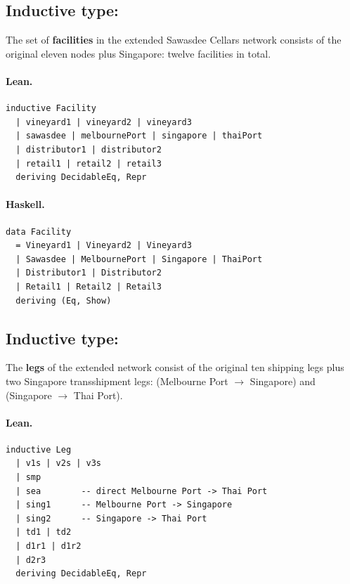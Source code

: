 \documentclass[11pt,a4paper]{article}
\begin{document}
\subsection{Inductive type: }

\begin{defn}
The set of \textbf{facilities} in the extended Sawasdee Cellars network consists
of the original eleven nodes plus Singapore: twelve facilities in total.
\end{defn}

\paragraph{Lean.}
\begin{lstlisting}[style=lean]
inductive Facility
  | vineyard1 | vineyard2 | vineyard3
  | sawasdee | melbournePort | singapore | thaiPort
  | distributor1 | distributor2
  | retail1 | retail2 | retail3
  deriving DecidableEq, Repr
\end{lstlisting}

\paragraph{Haskell.}
\begin{lstlisting}[style=haskell]
data Facility
  = Vineyard1 | Vineyard2 | Vineyard3
  | Sawasdee | MelbournePort | Singapore | ThaiPort
  | Distributor1 | Distributor2
  | Retail1 | Retail2 | Retail3
  deriving (Eq, Show)
\end{lstlisting}


\subsection{Inductive type: }

\begin{defn}
The \textbf{legs} of the extended network consist of the original ten shipping
legs plus two Singapore transshipment legs:  (Melbourne Port
$\to$ Singapore) and  (Singapore $\to$ Thai Port).
\end{defn}

\paragraph{Lean.}
\begin{lstlisting}[style=lean]
inductive Leg
  | v1s | v2s | v3s
  | smp
  | sea        -- direct Melbourne Port -> Thai Port
  | sing1      -- Melbourne Port -> Singapore
  | sing2      -- Singapore -> Thai Port
  | td1 | td2
  | d1r1 | d1r2
  | d2r3
  deriving DecidableEq, Repr
\end{lstlisting}
\end{document}
